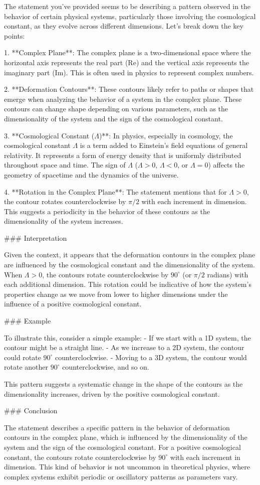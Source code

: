 The statement you've provided seems to be describing a pattern observed in the behavior of certain physical systems, particularly those involving the cosmological constant, as they evolve across different dimensions. Let's break down the key points:

1. **Complex Plane**: The complex plane is a two-dimensional space where the horizontal axis represents the real part (Re) and the vertical axis represents the imaginary part (Im). This is often used in physics to represent complex numbers.

2. **Deformation Contours**: These contours likely refer to paths or shapes that emerge when analyzing the behavior of a system in the complex plane. These contours can change shape depending on various parameters, such as the dimensionality of the system and the sign of the cosmological constant.

3. **Cosmological Constant (\(\Lambda\))**: In physics, especially in cosmology, the cosmological constant \(\Lambda\) is a term added to Einstein's field equations of general relativity. It represents a form of energy density that is uniformly distributed throughout space and time. The sign of \(\Lambda\) (\(\Lambda > 0\), \(\Lambda < 0\), or \(\Lambda = 0\)) affects the geometry of spacetime and the dynamics of the universe.

4. **Rotation in the Complex Plane**: The statement mentions that for \(\Lambda > 0\), the contour rotates counterclockwise by \(\pi/2\) with each increment in dimension. This suggests a periodicity in the behavior of these contours as the dimensionality of the system increases.

### Interpretation

Given the context, it appears that the deformation contours in the complex plane are influenced by the cosmological constant and the dimensionality of the system. When \(\Lambda > 0\), the contours rotate counterclockwise by \(90^\circ\) (or \(\pi/2\) radians) with each additional dimension. This rotation could be indicative of how the system's properties change as we move from lower to higher dimensions under the influence of a positive cosmological constant.

### Example

To illustrate this, consider a simple example:
- If we start with a 1D system, the contour might be a straight line.
- As we increase to a 2D system, the contour could rotate \(90^\circ\) counterclockwise.
- Moving to a 3D system, the contour would rotate another \(90^\circ\) counterclockwise, and so on.

This pattern suggests a systematic change in the shape of the contours as the dimensionality increases, driven by the positive cosmological constant.

### Conclusion

The statement describes a specific pattern in the behavior of deformation contours in the complex plane, which is influenced by the dimensionality of the system and the sign of the cosmological constant. For a positive cosmological constant, the contours rotate counterclockwise by \(90^\circ\) with each increment in dimension. This kind of behavior is not uncommon in theoretical physics, where complex systems exhibit periodic or oscillatory patterns as parameters vary.